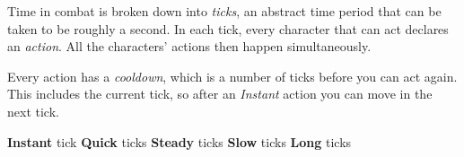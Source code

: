
Time in combat is broken down into \emph{ticks}, an abstract time period that can be taken to be roughly a second. In each tick, every character that can act declares an \emph{action}. All the characters' actions then happen simultaneously.

Every action has a \emph{cooldown}, which is a number of ticks before you can act again. This includes the current tick, so after an \emph{Instant} action you can move in the next tick.

{\footnotesize
  \textbf{Instant}  tick  \hfill
  \textbf{Quick}    ticks \hfill
  \textbf{Steady}   ticks \hfill
  \textbf{Slow}     ticks \hfill
  \textbf{Long}     ticks \hspace*{-5ex} %
}
